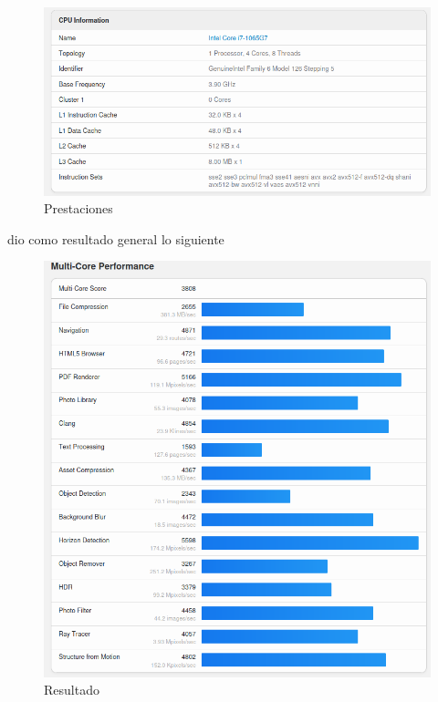 \begin{figure}[H]
    \centering
    \includegraphics[width=0.7\linewidth]{img/sistema.png}
    \caption{Prestaciones}
    \label{fig:enter-label}
    
\end{figure}
dio como resultado general lo siguiente
\begin{figure}[H]
    \centering
    \includegraphics[width=0.7\linewidth]{img/rendimientoGeek.png}
    \caption{Resultado}
    
\end{figure}


